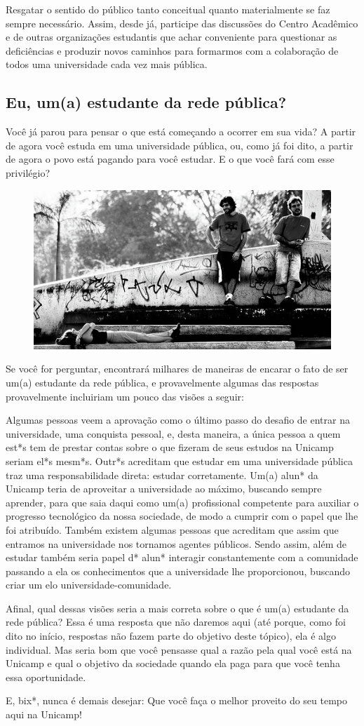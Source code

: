 Resgatar o sentido do público tanto conceitual quanto materialmente se faz
sempre necessário. Assim, desde já, participe das discussões do Centro Acadêmico
e de outras organizações estudantis que achar conveniente para questionar as
deficiências e produzir novos caminhos para formarmos com a colaboração de todos
uma universidade cada vez mais pública.

\subsection*{Eu, um(a) estudante da rede pública?}

Você já parou para pensar o que está começando a ocorrer em sua vida? A partir
de agora você estuda em uma universidade pública, ou, como já foi dito, a partir
de agora o povo está pagando para você estudar. E o que você fará com esse
privilégio?

\begin{figure}[h!]
    \centering
    \includegraphics[width=.45\textwidth]{img/ola_mundo/teatro_de_arena1.jpg}
\end{figure}

Se você for perguntar, encontrará milhares de maneiras de encarar o fato de ser
um(a) estudante da rede pública, e provavelmente algumas das respostas
provavelmente incluiriam um pouco das visões a seguir:

Algumas pessoas veem a aprovação como o último passo do desafio de entrar na
universidade, uma conquista pessoal, e, desta maneira, a única pessoa a quem
est*s tem de prestar contas sobre o que fizeram de seus estudos na Unicamp
seriam el*s mesm*s. Outr*s acreditam que estudar em uma universidade pública
traz uma responsabilidade direta: estudar corretamente. Um(a) alun* da Unicamp
teria de aproveitar a universidade ao máximo, buscando sempre aprender, para que
saia daqui como um(a) profissional competente para auxiliar o progresso
tecnológico da nossa sociedade, de modo a cumprir com o papel que lhe foi
atribuído. Também existem algumas pessoas que acreditam que assim que entramos
na universidade nos tornamos agentes públicos. Sendo assim, além de estudar
também seria papel d* alun* interagir constantemente com a comunidade passando a
ela os conhecimentos que a universidade lhe proporcionou, buscando criar um elo
universidade-comunidade.

Afinal, qual dessas visões seria a mais correta sobre o que é um(a) estudante da
rede pública? Essa é uma resposta que não daremos aqui (até porque, como foi
dito no início, respostas não fazem parte do objetivo deste tópico), ela é algo
individual. Mas seria bom que você pensasse qual a razão pela qual você está na
Unicamp e qual o objetivo da sociedade quando ela paga para que você tenha essa
oportunidade.

E, bix*, nunca é demais desejar: Que você faça o melhor proveito do seu tempo
aqui na Unicamp!
